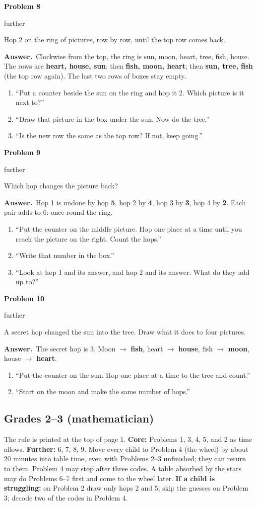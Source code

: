 \documentclass[11pt]{article}
\newcommand{\lbl}[1]{\colorbox{black!10}{\footnotesize\strut #1}}
\newcommand{\further}{\lbl{further}}
\newcommand{\pb}[3]{\par\needspace{4\baselineskip}\vspace{3pt}\noindent\textbf{Problem #1}\enspace #2\enspace #3\par}
\newcommand{\ans}{\textbf{Answer.}\ }
\newenvironment{hints}{\begin{enumerate}[label={\textit{Hint \arabic*.}}, leftmargin=*, align=left]}{\end{enumerate}}
\begin{document}
\pb{8}{\further}{Hop 2 on the ring of pictures, row by row, until the top row comes back.}
\ans Clockwise from the top, the ring is sun, moon, heart, tree, fish, house. The rows are
\textbf{heart, house, sun}; then \textbf{fish, moon, heart}; then \textbf{sun, tree, fish} (the top row again).
The last two rows of boxes stay empty.
\begin{hints}
\item ``Put a counter beside the sun on the ring and hop it 2. Which picture is it next to?''
\item ``Draw that picture in the box under the sun. Now do the tree.''
\item ``Is the new row the same as the top row? If not, keep going.''
\end{hints}

\pb{9}{\further}{Which hop changes the picture back?}
\ans Hop 1 is undone by hop \textbf{5}, hop 2 by \textbf{4}, hop 3 by \textbf{3}, hop 4 by \textbf{2}. Each
pair adds to 6: once round the ring.
\begin{hints}
\item ``Put the counter on the middle picture. Hop one place at a time until you reach the picture on the right.
  Count the hops.''
\item ``Write that number in the box.''
\item ``Look at hop 1 and its answer, and hop 2 and its answer. What do they add up to?''
\end{hints}

\pb{10}{\further}{A secret hop changed the sun into the tree. Draw what it does to four pictures.}
\ans The secret hop is 3. Moon $\to$ \textbf{fish}, heart $\to$ \textbf{house}, fish $\to$ \textbf{moon},
house $\to$ \textbf{heart}.
\begin{hints}
\item ``Put the counter on the sun. Hop one place at a time to the tree and count.''
\item ``Start on the moon and make the same number of hops.''
\end{hints}

\subsection{Grades 2--3 (mathematician)}
The rule is printed at the top of page 1. \textbf{Core:} Problems 1, 3, 4, 5, and 2 as time allows.
\textbf{Further:} 6, 7, 8, 9. Move every child to Problem 4 (the wheel) by about 20 minutes into table time, even
with Problems 2--3 unfinished; they can return to them. Problem 4 may stop after three codes. A table absorbed
by the stars may do Problems 6--7 first and come to the wheel later. \textbf{If a child is struggling:} on Problem 2 draw only
hops 2 and 5; skip the guesses on Problem 3; decode two of the codes in Problem 4.
\end{document}
